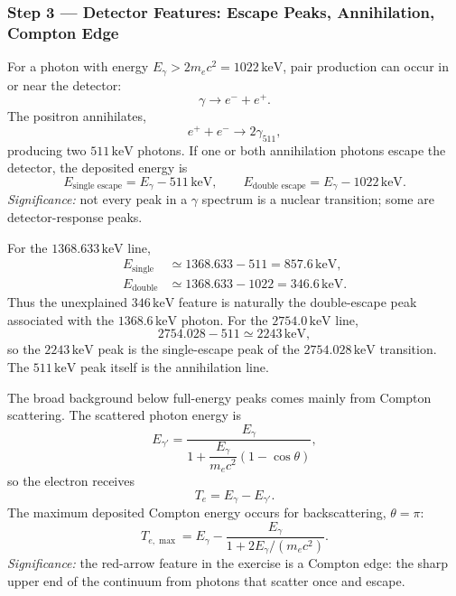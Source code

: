 \subsubsection*{Step 3 --- Detector Features: Escape Peaks, Annihilation, Compton Edge}
For a photon with energy $E_\gamma>2m_ec^2=1022\,\text{keV}$, pair production can
occur in or near the detector:
\begin{equation}
  \label{eq:lec10:pair_production}
  \gamma \to e^-+e^+.
\end{equation}
The positron annihilates,
\begin{equation}
  \label{eq:lec10:annihilation}
  e^+ + e^- \to 2\gamma_{511},
\end{equation}
producing two $511\,\text{keV}$ photons. If one or both annihilation photons
escape the detector, the deposited energy is
\begin{equation}
  \label{eq:lec10:escape_peaks}
  \boxed{
  E_\text{single escape}=E_\gamma-511\,\text{keV},\qquad
  E_\text{double escape}=E_\gamma-1022\,\text{keV}.}
\end{equation}
\textit{Significance:} not every peak in a $\gamma$ spectrum is a nuclear
transition; some are detector-response peaks.

For the $1368.633\,\text{keV}$ line,
\begin{align}
  \label{eq:lec10:escape_1368}
  E_\text{single} &\simeq 1368.633-511 = 857.6\,\text{keV},\\
  E_\text{double} &\simeq 1368.633-1022 = 346.6\,\text{keV}.
\end{align}
Thus the unexplained $346\,\text{keV}$ feature is naturally the double-escape
peak associated with the $1368.6\,\text{keV}$ photon. For the
$2754.0\,\text{keV}$ line,
\begin{equation}
  \label{eq:lec10:single_escape_2754}
  2754.028-511 \simeq 2243\,\text{keV},
\end{equation}
so the $2243\,\text{keV}$ peak is the single-escape peak of the
$2754.028\,\text{keV}$ transition. The $511\,\text{keV}$ peak itself is the
annihilation line.

The broad background below full-energy peaks comes mainly from Compton
scattering. The scattered photon energy is
\begin{equation}
  \label{eq:lec10:compton_photon}
  E_{\gamma'}=
  \frac{E_\gamma}{1+\dfrac{E_\gamma}{m_ec^2}(1-\cos\theta)},
\end{equation}
so the electron receives
\begin{equation}
  \label{eq:lec10:compton_electron_energy}
  T_e=E_\gamma-E_{\gamma'}.
\end{equation}
The maximum deposited Compton energy occurs for backscattering,
$\theta=\pi$:
\begin{equation}
  \label{eq:lec10:compton_edge}
  \boxed{
  T_{e,\max}
  =
  E_\gamma-
  \frac{E_\gamma}{1+2E_\gamma/(m_ec^2)}.}
\end{equation}
\textit{Significance:} the red-arrow feature in the exercise is a Compton edge:
the sharp upper end of the continuum from photons that scatter once and escape.

